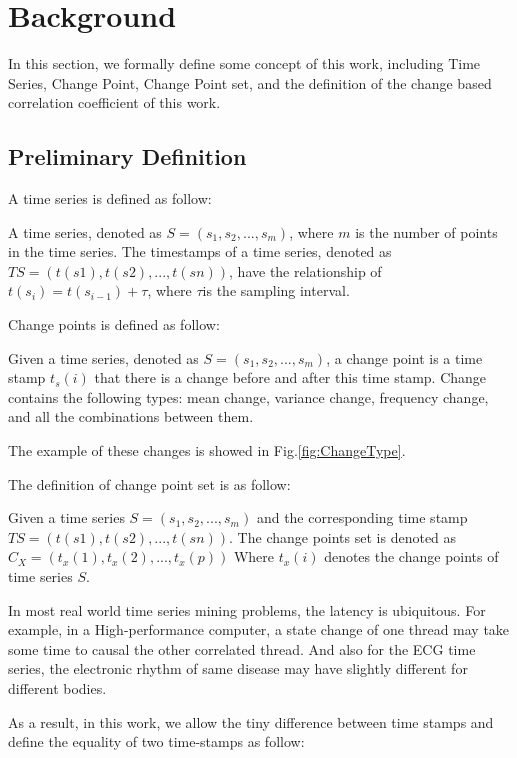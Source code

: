 \section{Background}
\label{sec:formulation}
In this section, we formally define some concept of this work, including Time Series, Change Point, Change Point set, and the definition of the change based correlation coefficient of this work.

\subsection{Preliminary Definition}

A time series is defined as follow:
\begin{definition}
A time series, denoted as $S = (s_1,s_2,...,s_m)$, where $m$ is the number of points in the time series. The timestamps of a time series, denoted as $TS = (t(s1), t(s2),..., t(sn))$, have the relationship of $t(s_i) = t(s_{i-1})+\tau$, where $\tau$is the sampling interval.
\end{definition}

Change points is defined as follow:
\begin{definition}
Given a time series, denoted as $S = (s_1,s_2,...,s_m)$, a change point is a time stamp $t_s(i)$ that there is a change before and after this time stamp. Change contains the following types: mean change, variance change, frequency change, and all the combinations between them.
\end{definition}
The example of these changes is showed in Fig.\ref{fig:ChangeType}.

The definition of change point set is as follow:
\begin{definition}
Given a time series
$S = (s_1,s_2,...,s_m)$
and the corresponding time stamp
$TS = (t(s1), t(s2),..., t(sn))$.
The change points set is denoted as 
$C_X=(t_x(1),t_x(2),...,t_x(p))$
Where $t_x(i)$ denotes the change points of time series $S$.
\end{definition}

In most real world time series mining problems, the latency is ubiquitous.
For example, in a High-performance computer, a state change of one thread may take some time to causal the other correlated thread. 
And also for the ECG time series, the electronic rhythm of same disease may have slightly different for different bodies.

As a result, in this work, we allow the tiny difference between time stamps and define the equality of two time-stamps as follow:


